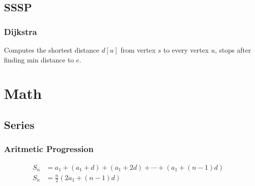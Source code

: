 \documentclass[12pt]{article}
\begin{document}
\subsection{SSSP}
\subsubsection{Dijkstra}

\noindent\begin{minipage}{\linewidth}

\end{minipage}
Computes the shortest distance $d[u]$ from vertex $s$ to every vertex $u$,
stops after finding min distance to $e$.

\section{Math}
\subsection{Series}
\subsubsection{Aritmetic Progression}
\begin{align*}
  S_n &= a_1 + (a_1+d) + (a_1+2d) + \cdots + (a_1+(n-1)d)\\
  S_n &= \frac{n}{2}(2a_1+(n-1)d)
\end{align*}
\end{document}
